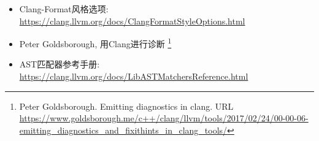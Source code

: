 \begin{itemize}
\item
Clang-Format风格选项: \url{https://clang.llvm.org/docs/ClangFormatStyleOptions.html}

\item
Peter Goldsborough, 用Clang进行诊断 \footnote{Peter Goldsborough. Emitting diagnostics in clang. URL \url{https://www.goldsborough.me/c++/clang/llvm/tools/2017/02/24/00-00-06-emitting_diagnostics_and_fixithints_in_clang_tools/}}

\item
AST匹配器参考手册: \url{https://clang.llvm.org/docs/LibASTMatchersReference.html}
\end{itemize}